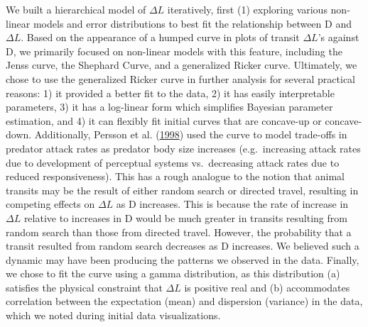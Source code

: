 \documentclass[twoside,12pt,final]{ucthesis-CA2012}
\begin{document}
\begin{ucmainmatter}
We built a hierarchical model of \(\Delta L\) iteratively, first (1) exploring various non-linear models and error distributions to best fit the relationship between D and \(\Delta L\). Based on the appearance of a humped curve in plots of transit \(\Delta L\)'s against D, we primarily focused on non-linear models with this feature, including the Jenss curve, the Shephard Curve, and a generalized Ricker curve. Ultimately, we chose to use the generalized Ricker curve in further analysis for several practical reasons: 1) it provided a better fit to the data, 2) it has easily interpretable parameters, 3) it has a log-linear form which simplifies Bayesian parameter estimation, and 4) it can flexibly fit initial curves that are concave-up or concave-down. Additionally, Persson et al. (\protect\hyperlink{ref-persson1998}{1998}) used the curve to model trade-offs in predator attack rates as predator body size increases (e.g.~increasing attack rates due to development of perceptual systems vs.~decreasing attack rates due to reduced responsiveness). This has a rough analogue to the notion that animal transits may be the result of either random search or directed travel, resulting in competing effects on \(\Delta L\) as D increases. This is because the rate of increase in \(\Delta L\) relative to increases in D would be much greater in transits resulting from random search than those from directed travel. However, the probability that a transit resulted from random search decreases as D increases. We believed such a dynamic may have been producing the patterns we observed in the data. Finally, we chose to fit the curve using a gamma distribution, as this distribution (a) satisfies the physical constraint that \(\Delta L\) is positive real and (b) accommodates correlation between the expectation (mean) and dispersion (variance) in the data, which we noted during initial data visualizations.


\end{ucmainmatter}
\end{document}
